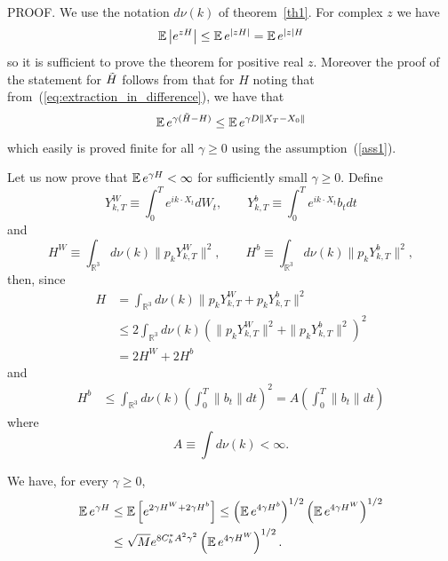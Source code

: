 PROOF. We use the notation $d\nu(k)$ of theorem~\ref{th1}. For complex 
$z$ we have
\begin{equation*}
\operatorname{{\mathbb E}} \left| e^{z H}\right| \leq \operatorname{{\mathbb E}} e^{\left| z
H\right| }  = \operatorname{{\mathbb E}} e^{\left|z \right| H} 
\end{equation*}
so it is sufficient to prove the theorem for positive real $z$.
Moreover the proof of the statement for $\Tilde{H}$ follows from that
for $H$ noting that
from~(\ref{eq:extraction_in_difference}), we have that
\begin{equation}
\operatorname{{\mathbb E}} e^{\gamma (\Tilde{H}-H)}  \le \operatorname{{\mathbb E}}  e^{\gamma D \|X_T-X_0\| }  
\end{equation} 
which easily is proved finite for all $\gamma\ge 0$ using the assumption~(\ref{ass1}).

Let us now prove that $\operatorname{{\mathbb E}} e^{\gamma H}<\infty$ for sufficiently
small $\gamma \geq 0$. Define
$$
Y^W_{k,T} \equiv \int_0^T e^{i k\cdot X_t} dW_t, \qquad
 Y^b_{k,T} \equiv \int_0^T e^{i k\cdot X_t} b_t dt
$$
and
$$
H^W \equiv \int_{\mathbb{R}^3}d\nu(k) \|p_k Y^W_{k,T}\|^2, \qquad
H^b \equiv \int_{\mathbb{R}^3}d\nu(k) \|p_k Y^b_{k,T}\|^2,
$$
then, since
\begin{equation}
\begin{split}
H & = \int_{\mathbb{R}^3} d\nu(k) \|p_k Y^W_{k,T} + p_k Y^b_{k,T} \|^2 \\
& \le  2 \int_{\mathbb{R}^3}d\nu(k) \left( \|p_k Y^W_{k,T} \|^2 + \|p_k Y^b_{k,T}
  \|^2\right)^2 \\ & = 2 H^W + 2 H^b
\end{split}
\label{eq:pitagora}
\end{equation}
and
\begin{equation*}
\begin{split}
H^b & \le \int_{\mathbb{R}^3}d\nu(k)\left( \int_0^T \|b_t\| dt\right)^2 
= A \left( \int_0^T \|b_t\| dt\right)
\end{split}
\end{equation*}
where 
\begin{equation}
A \equiv \int d\nu \left( k\right) < \infty.
  \label{defA}
\end{equation}

We have, for every $\gamma \ge 0$, 
\begin{equation}
\begin{split}
\operatorname{{\mathbb E}} e^{ \gamma H } &\le \operatorname{{\mathbb E}} \left[ e^{  2 \gamma  H^W +  2 \gamma
  H^b  } \right] \le
 \left(\operatorname{{\mathbb E}}  e^{ 4 \gamma  H^b}\right)^{1/2}
\left(\operatorname{{\mathbb E}}  e^{ 4 \gamma  H^W}\right)^{1/2}
\\ & \le  \sqrt{M} e^{ 8 C^*_b A^2 \gamma^2}  \left(\operatorname{{\mathbb E}}  e^{ 4 \gamma  H^W}\right)^{1/2}. 
\end{split}
\label{splitting_hw_and_hb}
\end{equation}

